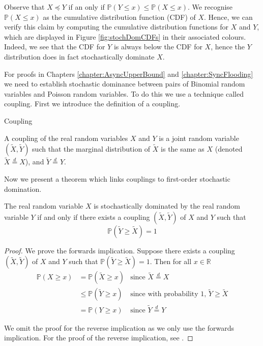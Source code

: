 Observe that $X \preceq Y$ if an only if $\mathbb{P}(Y \leq x) \leq \mathbb{P}(X \leq x)$. We recognise $\mathbb{P}(X \leq x)$ as the cumulative distribution function (CDF) of $X$. Hence, we can verify this claim by computing the cumulative  distribution functions for $X$ and $Y$, which are displayed in Figure \ref{fig:stochDomCDFs} in their associated colours. Indeed, we see that the CDF for $Y$ is always below the CDF for $X$, hence the $Y$ distribution does in fact stochastically dominate $X$.

For proofs in Chapters \ref{chapter:AsyncUpperBound} and \ref{chapter:SyncFlooding} we need to establish stochastic dominance between pairs of Binomial random variables and Poisson random variables. To do this we use a technique called coupling. First we introduce the definition of a coupling.

\begin{definition} 
	Coupling

	\noindent
	A coupling of the real random variables $X$ and $Y$ is a joint random variable $(\tilde{X}, \tilde{Y})$ such that the marginal distribution of $\tilde{X}$ is the same as $X$ (denoted $\tilde{X} \stackrel{d}{=} X$), and $\tilde{Y} \stackrel{d}{=} Y$.
\end{definition}


Now we present a theorem which links couplings to first-order stochastic domination.

\begin{theorem}\label{theorem:couplingDomination}
	The real random variable $X$ is stochastically dominated by the real random variable $Y$ if and only if there exists a coupling $(\tilde{X}, \tilde{Y})$ of $X$ and $Y$ such that
	$$
		\mathbb{P}(\tilde{Y} \geq \tilde{X}) = 1
	$$
\end{theorem}

\begin{proof}
	We prove the forwards implication. Suppose there exists a coupling $(\tilde{X}, \tilde{Y})$ of $X$ and $Y$ such that $\mathbb{P}(\tilde{Y} \geq \tilde{X}) = 1$. Then for all $x \in \mathbb{R}$
	\begin{align*}
		\mathbb{P}(X \geq x) &= \mathbb{P}(\tilde{X} \geq x) & \text{since } \tilde{X} \stackrel{d}{=} X \\
		&\leq \mathbb{P}(\tilde{Y} \geq x) & \text{since with probability 1, } \tilde{Y} \geq \tilde{X} \\
		&= \mathbb{P}(Y \geq x) & \text{since } \tilde{Y} \stackrel{d}{=} Y 
	\end{align*}

	We omit the proof for the reverse implication as we only use the forwards implication. For the proof of the reverse implication, see \cite{coupling}.
\end{proof}

